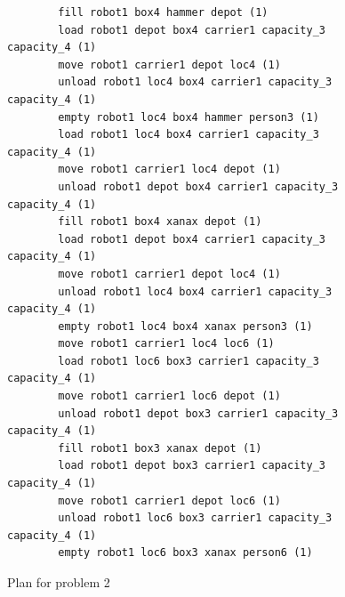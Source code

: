 \begin{figure}
\begin{verbatim}
        fill robot1 box4 hammer depot (1)
        load robot1 depot box4 carrier1 capacity_3 capacity_4 (1)
        move robot1 carrier1 depot loc4 (1)
        unload robot1 loc4 box4 carrier1 capacity_3 capacity_4 (1)
        empty robot1 loc4 box4 hammer person3 (1)
        load robot1 loc4 box4 carrier1 capacity_3 capacity_4 (1)
        move robot1 carrier1 loc4 depot (1)
        unload robot1 depot box4 carrier1 capacity_3 capacity_4 (1)
        fill robot1 box4 xanax depot (1)
        load robot1 depot box4 carrier1 capacity_3 capacity_4 (1)
        move robot1 carrier1 depot loc4 (1)
        unload robot1 loc4 box4 carrier1 capacity_3 capacity_4 (1)
        empty robot1 loc4 box4 xanax person3 (1)
        move robot1 carrier1 loc4 loc6 (1)
        load robot1 loc6 box3 carrier1 capacity_3 capacity_4 (1)
        move robot1 carrier1 loc6 depot (1)
        unload robot1 depot box3 carrier1 capacity_3 capacity_4 (1)
        fill robot1 box3 xanax depot (1)
        load robot1 depot box3 carrier1 capacity_3 capacity_4 (1)
        move robot1 carrier1 depot loc6 (1)
        unload robot1 loc6 box3 carrier1 capacity_3 capacity_4 (1)
        empty robot1 loc6 box3 xanax person6 (1)
    \end{verbatim}
    \caption{Plan for problem 2}
    \label{problem2_plan}
\end{figure}

